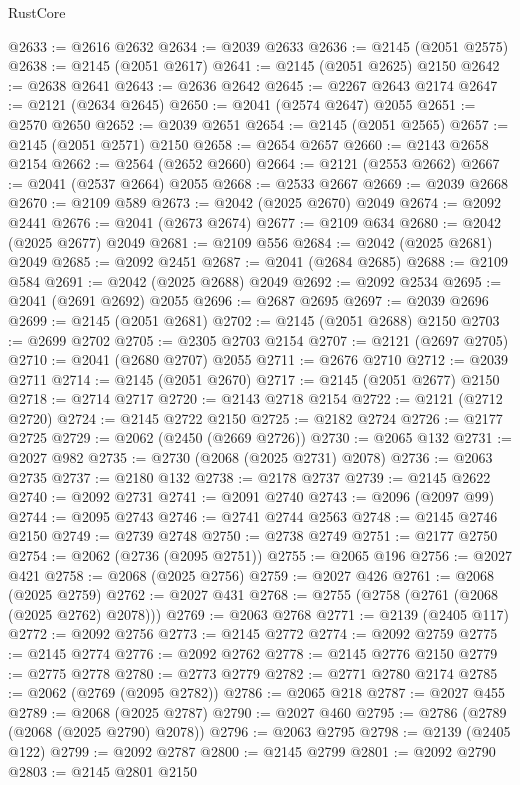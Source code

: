 \begin{lexlean}{RustCore}
\begin{coremodule}
@2633 := @2616 @2632
@2634 := @2039 @2633
@2636 := @2145 (@2051 @2575)
@2638 := @2145 (@2051 @2617)
@2641 := @2145 (@2051 @2625) @2150
@2642 := @2638 @2641
@2643 := @2636 @2642
@2645 := @2267 @2643 @2174
@2647 := @2121 (@2634 @2645)
@2650 := @2041 (@2574 @2647) @2055
@2651 := @2570 @2650
@2652 := @2039 @2651
@2654 := @2145 (@2051 @2565)
@2657 := @2145 (@2051 @2571) @2150
@2658 := @2654 @2657
@2660 := @2143 @2658 @2154
@2662 := @2564 (@2652 @2660)
@2664 := @2121 (@2553 @2662)
@2667 := @2041 (@2537 @2664) @2055
@2668 := @2533 @2667
@2669 := @2039 @2668
@2670 := @2109 @589
@2673 := @2042 (@2025 @2670) @2049
@2674 := @2092 @2441
@2676 := @2041 (@2673 @2674)
@2677 := @2109 @634
@2680 := @2042 (@2025 @2677) @2049
@2681 := @2109 @556
@2684 := @2042 (@2025 @2681) @2049
@2685 := @2092 @2451
@2687 := @2041 (@2684 @2685)
@2688 := @2109 @584
@2691 := @2042 (@2025 @2688) @2049
@2692 := @2092 @2534
@2695 := @2041 (@2691 @2692) @2055
@2696 := @2687 @2695
@2697 := @2039 @2696
@2699 := @2145 (@2051 @2681)
@2702 := @2145 (@2051 @2688) @2150
@2703 := @2699 @2702
@2705 := @2305 @2703 @2154
@2707 := @2121 (@2697 @2705)
@2710 := @2041 (@2680 @2707) @2055
@2711 := @2676 @2710
@2712 := @2039 @2711
@2714 := @2145 (@2051 @2670)
@2717 := @2145 (@2051 @2677) @2150
@2718 := @2714 @2717
@2720 := @2143 @2718 @2154
@2722 := @2121 (@2712 @2720)
@2724 := @2145 @2722 @2150
@2725 := @2182 @2724
@2726 := @2177 @2725
@2729 := @2062 (@2450 (@2669 @2726))
@2730 := @2065 @132
@2731 := @2027 @982
@2735 := @2730 (@2068 (@2025 @2731) @2078)
@2736 := @2063 @2735
@2737 := @2180 @132
@2738 := @2178 @2737
@2739 := @2145 @2622
@2740 := @2092 @2731
@2741 := @2091 @2740
@2743 := @2096 (@2097 @99)
@2744 := @2095 @2743
@2746 := @2741 @2744 @2563
@2748 := @2145 @2746 @2150
@2749 := @2739 @2748
@2750 := @2738 @2749
@2751 := @2177 @2750
@2754 := @2062 (@2736 (@2095 @2751))
@2755 := @2065 @196
@2756 := @2027 @421
@2758 := @2068 (@2025 @2756)
@2759 := @2027 @426
@2761 := @2068 (@2025 @2759)
@2762 := @2027 @431
@2768 := @2755 (@2758 (@2761 (@2068 (@2025 @2762) @2078)))
@2769 := @2063 @2768
@2771 := @2139 (@2405 @117)
@2772 := @2092 @2756
@2773 := @2145 @2772
@2774 := @2092 @2759
@2775 := @2145 @2774
@2776 := @2092 @2762
@2778 := @2145 @2776 @2150
@2779 := @2775 @2778
@2780 := @2773 @2779
@2782 := @2771 @2780 @2174
@2785 := @2062 (@2769 (@2095 @2782))
@2786 := @2065 @218
@2787 := @2027 @455
@2789 := @2068 (@2025 @2787)
@2790 := @2027 @460
@2795 := @2786 (@2789 (@2068 (@2025 @2790) @2078))
@2796 := @2063 @2795
@2798 := @2139 (@2405 @122)
@2799 := @2092 @2787
@2800 := @2145 @2799
@2801 := @2092 @2790
@2803 := @2145 @2801 @2150

\end{coremodule}
\end{lexlean}
